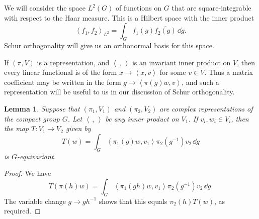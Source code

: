 \documentclass[12pt,reqno]{book}%
\newtheorem{lemma}{Lemma}[chapter]
\theoremstyle{definition}
\theoremstyle{remark}
\theoremstyle{theorem}
\theoremstyle{remark}
\renewcommand{\d}{\dd}
\begin{document}
We will consider the space $L^2(G)$ of functions on $G$ that are square-integrable with respect to the Haar measure.
This is a Hilbert space with the inner product
\[
    {\left\langle f_1, f_2\right\rangle}_{L^2} = \int_{G} f_1(g)\overline{f_2(g)} \, \d g.
\]
Schur orthogonality will give us an orthonormal basis for this space.

If $(\pi, V)$ is a representation, and ${\left\langle \, , \,\right\rangle}$ is an invariant inner product on $V$, then every linear functional is of the form $x \to {\left\langle x, v\right\rangle}$ for some $v \in V$.
Thus a matrix coefficient may be written in the form $g \to {\left\langle \pi(g) w, v\right\rangle}$, and such a representation will be useful to us in our discussion of Schur orthogonality.

\begin{lemma}\label{lemequivariantcxrep}%
    Suppose that $(\pi_1, V_1)$ and $(\pi_2, V_2)$ are complex representations of the compact group $G$.
    Let ${\left\langle \, , \,\right\rangle}$ be any inner product on $V_1$.
    If $v_i, w_i \in V_i$, then the map $T : V_1 \to V_2$ given by
    \begin{equation}\label{eqlemequivariantcxrep}
        T(w) = \int_{G} {\left\langle \pi_1(g)w, v_1\right\rangle} \pi_2(g^{-1})v_2 \, \d g
    \end{equation}
    is $G$-equivariant.
\end{lemma}%
\begin{proof}%
    We have
    \[
        T(\pi(h)w) = \int_{G} {\left\langle \pi_1(gh)w, v_1\right\rangle} \pi_2(g^{-1})v_2 \, \d g.
    \]
    The variable change $g \to gh^{-1}$ shows that this equals $\pi_2(h) T(w)$, as required.
\end{proof}%
\end{document}
